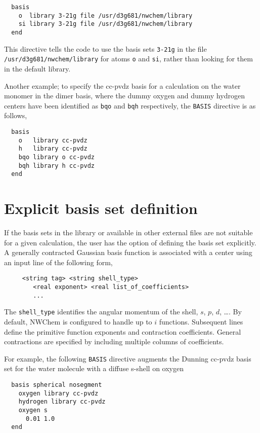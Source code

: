 \begin{verbatim}
  basis
    o  library 3-21g file /usr/d3g681/nwchem/library
    si library 3-21g file /usr/d3g681/nwchem/library
  end
\end{verbatim}

This directive tells the code to use the basis sets \verb+3-21g+ in
the file {\tt /usr/\-d3g681/\-nwchem/\-library} for atoms \verb+o+ and
\verb+si+, rather than looking for them in the default library.

Another example;  to specify the cc-pvdz basis for a calculation on
the water monomer in the dimer basis, where the dummy oxygen and dummy
hydrogen centers have been identified as \verb+bqo+ and \verb+bqh+
respectively, the \verb+BASIS+ directive is as follows,

\begin{verbatim}
  basis
    o   library cc-pvdz
    h   library cc-pvdz
    bqo library o cc-pvdz
    bqh library h cc-pvdz
  end
\end{verbatim}

\section{Explicit basis set definition}

If the basis sets in the library or available in other external files
are not suitable for a given calculation, the user has the option
of defining the basis set explicitly.
A generally contracted Gaussian basis function is associated with a
center using an input line of the following form,
\begin{verbatim}
     <string tag> <string shell_type>
        <real exponent> <real list_of_coefficients>
        ...
\end{verbatim}

The \verb+shell_type+ identifies the angular momentum of the shell,
$s$, $p$, $d$, \ldots.  By default, NWChem is configured to handle up
to $i$ functions.  Subsequent lines define the primitive function
exponents and contraction coefficients.  General contractions are
specified by including multiple columns of coefficients.

For example, the following \verb+BASIS+ directive augments the Dunning
cc-pvdz basis set for the water molecule with a diffuse s-shell on
oxygen
\begin{verbatim}
  basis spherical nosegment
    oxygen library cc-pvdz
    hydrogen library cc-pvdz
    oxygen s
      0.01 1.0
  end
\end{verbatim}

